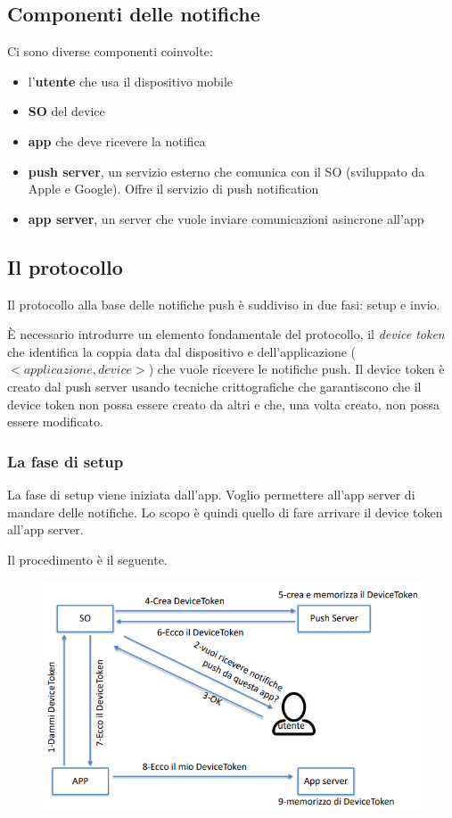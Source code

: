 \subsection{Componenti delle notifiche}
Ci sono diverse componenti coinvolte:
\begin{itemize}
    \item l'\textbf{utente} che usa il dispositivo mobile
    \item \textbf{SO} del device
    \item \textbf{app} che deve ricevere la notifica
    \item \textbf{push server}, un servizio esterno che comunica con il SO (sviluppato da Apple e Google). Offre il servizio di push notification
    \item \textbf{app server}, un server che vuole inviare comunicazioni asincrone all'app
\end{itemize}

\subsection{Il protocollo}
Il protocollo alla base delle notifiche push è suddiviso in due fasi: setup e invio.

È necessario introdurre un elemento fondamentale del protocollo, il \textit{device token} che identifica la coppia data dal dispositivo e dell'applicazione ($<applicazione, device>$) che vuole ricevere le notifiche push. Il device token è creato dal push server usando tecniche crittografiche che garantiscono che il device token non possa essere creato da altri e che, una volta creato, non possa essere modificato.

\subsubsection{La fase di setup}
La fase di setup viene iniziata dall'app. Voglio permettere all'app server di mandare delle notifiche. 
Lo scopo è quindi quello di fare arrivare il device token all'app server. 
 
Il procedimento è il seguente.

\begin{figure}[!ht]
    \centering
    \includegraphics[width=.65\textwidth]{images/Mobile computing/3. Reti e architetture/setup.PNG}
\end{figure}

